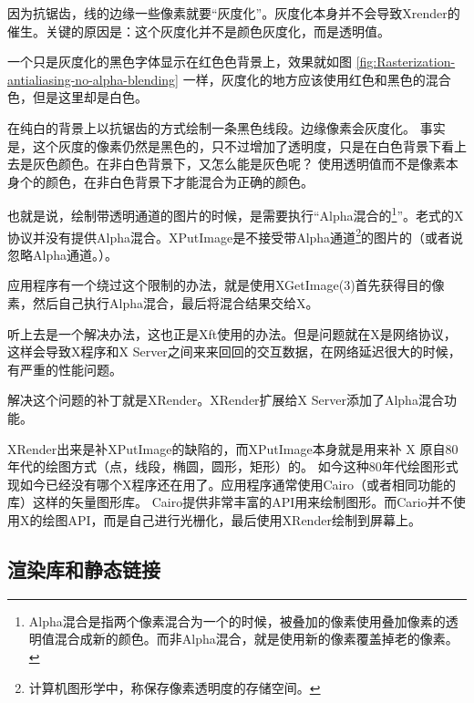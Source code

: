 
因为抗锯齿，线的边缘一些像素就要“灰度化”。灰度化本身并不会导致Xrender的催生。关键的原因是：这个灰度化并不是颜色灰度化，而是透明值。

一个只是灰度化的黑色字体显示在红色色背景上，效果就如图 \ref{fig:Rasterization-antialiasing-no-alpha-blending} 一样，灰度化的地方应该使用红色和黑色的混合色，但是这里却是白色。


在纯白的背景上以抗锯齿的方式绘制一条黑色线段。边缘像素会灰度化。
事实是，这个灰度的像素仍然是黑色的，只不过增加了透明度，只是在白色背景下看上去是灰色颜色。在非白色背景下，又怎么能是灰色呢？
使用透明值而不是像素本身个的颜色，在非白色背景下才能混合为正确的颜色。


也就是说，绘制带透明通道的图片的时候，是需要执行“Alpha混合的\footnote{Alpha混合是指两个像素混合为一个的时候，被叠加的像素使用叠加像素的透明值混合成新的颜色。而非Alpha混合，就是使用新的像素覆盖掉老的像素。}”。老式的X协议并没有提供Alpha混合。XPutImage是不接受带Alpha通道\footnote{计算机图形学中，称保存像素透明度的存储空间。}的图片的（或者说忽略Alpha通道。）。


应用程序有一个绕过这个限制的办法，就是使用XGetImage(3)首先获得目的像素，然后自己执行Alpha混合，最后将混合结果交给X。

听上去是一个解决办法，这也正是Xft使用的办法。但是问题就在X是网络协议，这样会导致X程序和X Server之间来来回回的交互数据，在网络延迟很大的时候，有严重的性能问题。

解决这个问题的补丁就是XRender。XRender扩展给X Server添加了Alpha混合功能。

XRender出来是补XPutImage的缺陷的，而XPutImage本身就是用来补 X 原自80年代的绘图方式（点，线段，椭圆，圆形，矩形）的。
如今这种80年代绘图形式现如今已经没有哪个X程序还在用了。应用程序通常使用Cairo（或者相同功能的库）这样的矢量图形库。
Cairo提供非常丰富的API用来绘制图形。而Cario并不使用X的绘图API，而是自己进行光栅化，最后使用XRender绘制到屏幕上。

\subsection{渲染库和静态链接}

